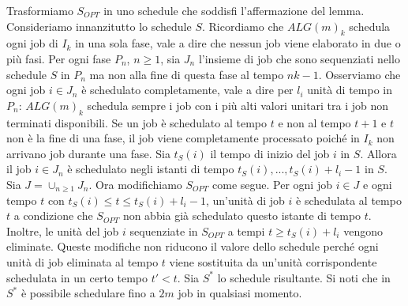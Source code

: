 \documentclass[twoside,openany,titlepage,fleqn,
	headinclude,12pt,a4paper,BCOR5mm,footinclude]{scrbook}
\begin{document}
Trasformiamo $S_{OPT}$ in uno schedule che soddisfi l'affermazione del lemma. Consideriamo innanzitutto lo schedule $S$. Ricordiamo che $ALG(m)_{k}$ schedula ogni job di $I_{k}$ in una sola fase, vale a dire che nessun job viene elaborato in due o più fasi. Per ogni fase $P_{n}$, $n \geq 1$, sia $J_{n}$ l'insieme di job che sono sequenziati nello schedule $S$ in $P_{n}$ ma non alla fine di questa fase al tempo $nk - 1$. Osserviamo che ogni job $i \in J_{n}$ è schedulato completamente, vale a dire per $l_{i}$ unità di tempo in $P_{n}$: $ALG(m)_{k}$ schedula sempre i job con i più alti valori unitari tra i job non terminati disponibili. Se un job è schedulato al tempo $t$ e non al tempo $t + 1$ e $t$ non è la fine di una fase, il job viene completamente processato poiché in $I_{k}$ non arrivano job durante una fase. Sia $t_{S} (i)$ il tempo di inizio del job $i$ in $S$. Allora il job $i \in J_{n}$ è schedulato negli istanti di tempo $t_{S}(i), . . . , t_{S}(i) + l_{i} - 1$ in $S$. Sia $J = \cup_{n \geq 1} J_{n}$. Ora modifichiamo $S_{OPT}$ come segue. Per ogni job $i \in J$ e ogni tempo $t$ con $t_{S}(i) \leq t \leq t_{S} (i) + l_{i} - 1$, un'unità di job $i$ è schedulata al tempo $t$ a condizione che $S_{OPT}$ non abbia già schedulato questo istante di tempo $t$. Inoltre, le unità del job $i $ sequenziate in $S_{OPT}$ a tempi $t \geq t_{S}(i) + l_{i}$ vengono eliminate. Queste modifiche non riducono il valore dello schedule perché ogni unità di job eliminata al tempo $t$ viene sostituita da un'unità corrispondente schedulata in un certo tempo $t' < t$. Sia $S^{*}$ lo schedule risultante. Si noti che in $S^{*}$ è possibile schedulare fino a $2m$ job in qualsiasi momento. 
\end{document}
